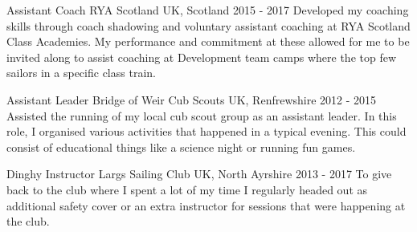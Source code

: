 



\begin{cventries}

  \cventry
    {Assistant Coach} %
    {RYA Scotland} %
    {UK, Scotland} %
    {2015 - 2017} %
    {
      Developed my coaching skills through coach shadowing and voluntary assistant coaching at RYA Scotland Class Academies. My performance and commitment at these allowed for me to be invited along to assist coaching at Development team camps where the top few sailors in a specific class train.
    }
    

  \cventry
    {Assistant Leader} %
    {Bridge of Weir Cub Scouts} %
    {UK, Renfrewshire} %
    {2012 - 2015} %
    {
      Assisted the running of my local cub scout group as an assistant leader. In this role, I organised various activities that happened in a typical evening. This could consist of educational things like a science night or running fun games.
    }

  \cventry
    {Dinghy Instructor} %
    {Largs Sailing Club} %
    {UK, North Ayrshire} %
    {2013 - 2017} %
    {
      To give back to the club where I spent a lot of my time I regularly headed out as additional safety cover or an extra instructor for sessions that were happening at the club.
    }

\end{cventries}